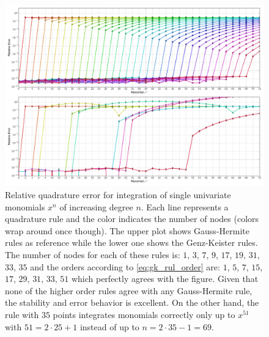 \documentclass[a4paper,10pt]{article}
\begin{document}
\clearpage

\begin{figure}
  \centering
  \includegraphics[width=\linewidth]{./img/monomial_errors_hermitephy.pdf}
  \caption{Relative quadrature error for integration of single univariate monomials $x^n$ of increasing degree $n$.
  Each line represents a quadrature rule and the color indicates the number of nodes (colors wrap around once though).
  The upper plot shows Gauss-Hermite rules as reference while the lower one shows the Genz-Keister rules.
  The number of nodes for each of these rules is:
  $1$, $3$, $7$,  $9$, $17$, $19$, $31$, $33$, $35$
  and the orders according to \eqref{eq:gk_rul_order} are:
  $1$, $5$, $7$, $15$, $17$, $29$, $31$, $33$, $51$
  which perfectly agrees with the figure. Given that none of the higher order rules agree with any Gauss-Hermite rule,
  the stability and error behavior is excellent. On the other hand, the rule with $35$ points integrates monomials
  correctly only up to $x^{51}$ with $51 = 2 \cdot 25 + 1$ instead of up to $n = 2 \cdot 35 - 1 = 69$.}
  \label{fig:conv_monom_hermite}
\end{figure}
\end{document}
